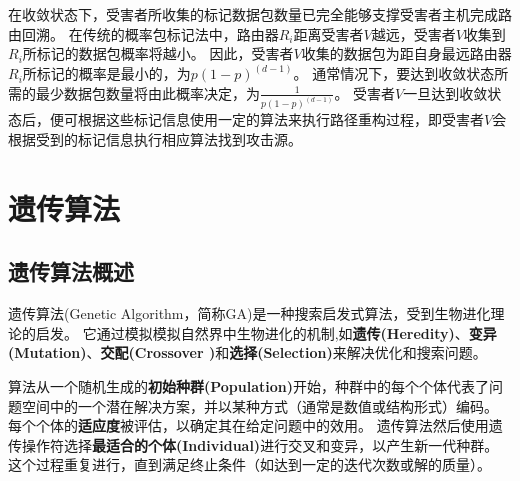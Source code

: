 在收敛状态下，受害者所收集的标记数据包数量已完全能够支撑受害者主机完成路由回溯。
在传统的概率包标记法中，路由器$R_i$距离受害者$V$越远，受害者$V$收集到$R_i$所标记的数据包概率将越小。
因此，受害者$V$收集的数据包为距自身最远路由器$R_i$所标记的概率是最小的，为$p(1-p)^(d-1)$。
通常情况下，要达到收敛状态所需的最少数据包数量将由此概率决定，为$\frac{1}{p(1-p)^(d-1)}$。
受害者$V$一旦达到收敛状态后，便可根据这些标记信息使用一定的算法来执行路径重构过程，即受害者$V$会根据受到的标记信息执行相应算法找到攻击源。

\section{遗传算法\cite{zhou2006matlab}}
\label{sec:GA}
\subsection{遗传算法概述}
遗传算法(Genetic Algorithm，简称GA)是一种搜索启发式算法，受到生物进化理论的启发。
它通过模拟模拟自然界中生物进化的机制,如\textbf{遗传(Heredity)}、\textbf{变异(Mutation)}、\textbf{交配(Crossover )}和\textbf{选择(Selection)}来解决优化和搜索问题。


算法从一个随机生成的\textbf{初始种群(Population)}开始，种群中的每个个体代表了问题空间中的一个潜在解决方案，并以某种方式（通常是数值或结构形式）编码。
每个个体的\textbf{适应度}被评估，以确定其在给定问题中的效用。
遗传算法然后使用遗传操作符选择\textbf{最适合的个体(Individual)}进行交叉和变异，以产生新一代种群。
这个过程重复进行，直到满足终止条件（如达到一定的迭代次数或解的质量）。


